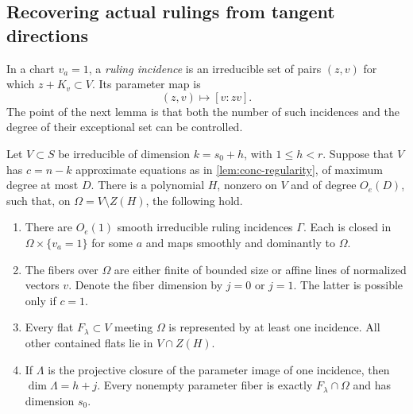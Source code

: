 \subsection{Recovering actual rulings from tangent directions}

In a chart $v_a=1$, a \emph{ruling incidence} is an irreducible set of pairs $(z,v)$ for which $z+K_v\subset V$.  Its parameter map is
\begin{equation}
 (z,v)\longmapsto[v:zv].
 \label{eq:conc-parameter-map}
\end{equation}
The point of the next lemma is that both the number of such incidences and the degree of their exceptional set can be controlled.

\begin{lemma}
\label{lem:conc-rulings}
Let $V\subset S$ be irreducible of dimension $k=s_0+h$, with $1\leq h<r$.  Suppose that $V$ has $c=n-k$ approximate equations as in \cref{lem:conc-regularity}, of maximum degree at most $D$. There is a polynomial $H$, nonzero on $V$ and of degree $O_e(D)$, such that, on $\Omega=V\setminus Z(H)$, the following hold.
\begin{enumerate}
\item There are $O_e(1)$ smooth irreducible ruling incidences $\Gamma$.
      Each is closed in $\Omega\times\{v_a=1\}$ for some $a$ and maps smoothly and dominantly to $\Omega$.
\item The fibers over $\Omega$ are either finite of bounded size or
      affine lines of normalized vectors $v$.  Denote the fiber dimension by $j=0$ or $j=1$.  The latter is possible only if $c=1$.
\item Every flat $F_\lambda\subset V$ meeting $\Omega$ is represented
      by at least one incidence.  All other contained flats lie in $V\cap Z(H)$.
\item If $\Lambda$ is the projective closure of the parameter image
      of one incidence, then $\dim\Lambda=h+j$.  Every nonempty parameter fiber is exactly $F_\lambda\cap\Omega$ and has dimension $s_0$.
\end{enumerate}
\end{lemma}

